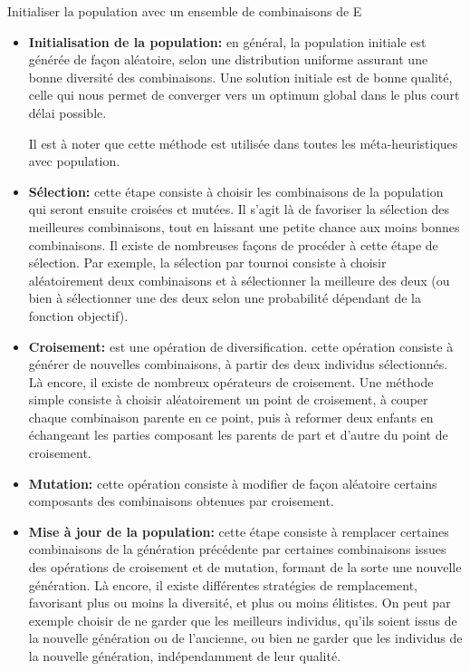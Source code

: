 \begin{enumerate}[label=\alph*)]
\begin{algorithm}[H]
Initialiser la population avec un ensemble de combinaisons de E \;

\end{algorithm}

	
\begin{itemize}
	\item \textbf{Initialisation de la population: }en général, la population initiale est générée de façon aléatoire, selon une distribution uniforme assurant une bonne diversité des combinaisons. Une solution initiale est de bonne qualité, celle qui nous permet de converger vers un optimum global dans le plus court délai possible.
	
Il est à noter que cette méthode est utilisée dans toutes les méta-heuristiques avec population.

	\item \textbf{Sélection: } cette étape consiste à choisir les combinaisons de la population qui seront ensuite croisées et mutées. Il s’agit là de favoriser la sélection des meilleures combinaisons, tout en laissant une petite chance aux moins bonnes combinaisons. Il existe de nombreuses façons de procéder à cette étape de sélection. Par exemple, la sélection par tournoi consiste à choisir aléatoirement deux combinaisons et à sélectionner la meilleure des deux (ou bien à sélectionner une des deux selon une probabilité dépendant de la fonction objectif).
	
	\item \textbf{Croisement:} est une opération de diversification. cette opération consiste à générer de nouvelles combinaisons, à partir des deux individus sélectionnés. Là encore, il existe de nombreux opérateurs de croisement. Une méthode simple consiste à choisir aléatoirement un point de croisement, à couper chaque combinaison parente en ce point, puis à reformer deux enfants en échangeant les parties composant les parents de part et d’autre du point de croisement.
	
	\item \textbf{Mutation: } cette opération consiste à modifier de façon aléatoire certains composants des combinaisons obtenues par croisement.
	
	\item \textbf{Mise à jour de la population: } cette étape consiste à remplacer certaines combinaisons de la génération précédente par certaines combinaisons issues des opérations de croisement et de mutation, formant de la sorte une nouvelle génération. Là encore, il existe différentes stratégies de remplacement, favorisant plus ou moins la diversité, et plus ou moins élitistes. On peut par exemple choisir de ne garder que les meilleurs individus, qu’ils soient issus de la nouvelle génération ou de l’ancienne, ou bien ne garder que les individus de la nouvelle génération, indépendamment de leur qualité.
	

\end{itemize}
\end{enumerate}
